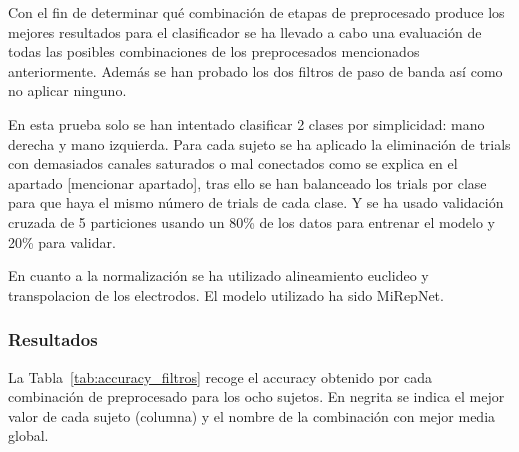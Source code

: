 Con el fin de determinar qué combinación de etapas de preprocesado produce los mejores resultados para el clasificador se ha llevado a cabo una evaluación de todas las posibles combinaciones de los preprocesados mencionados anteriormente. Además se han probado los dos filtros de paso de banda así como no aplicar ninguno. 

En esta prueba solo se han intentado clasificar 2 clases por simplicidad: mano derecha y mano izquierda. Para cada sujeto se ha aplicado la eliminación de trials con demasiados canales saturados o mal conectados como se explica en el apartado [mencionar apartado], tras ello se han balanceado los trials por clase para que haya el mismo número de trials de cada clase. Y se ha usado validación cruzada de 5 particiones usando un 80\% de los datos para entrenar el modelo y 20\% para validar. 

En cuanto a la normalización se ha utilizado alineamiento euclideo y transpolacion de los electrodos. El modelo utilizado ha sido MiRepNet.


\subsubsection{Resultados}

La Tabla~\ref{tab:accuracy_filtros} recoge el accuracy obtenido por cada combinación de preprocesado para los ocho sujetos. En negrita se indica el mejor valor de cada sujeto (columna) y el nombre de la combinación con mejor media global.

